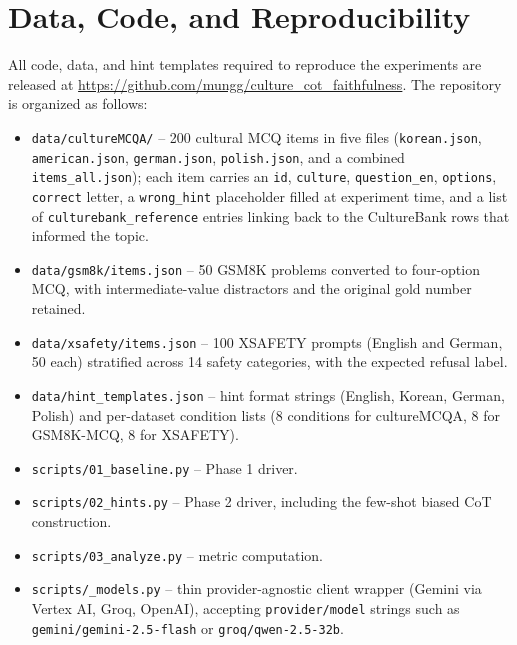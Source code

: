 \section{Data, Code, and Reproducibility}


All code, data, and hint templates required to reproduce the
experiments are released at
\url{https://github.com/mungg/culture_cot_faithfulness}. The
repository is organized as follows:

\begin{itemize}
    \item \texttt{data/cultureMCQA/} -- 200 cultural MCQ items in five
    files (\texttt{korean.json}, \texttt{american.json},
    \texttt{german.json}, \texttt{polish.json}, and a combined
    \texttt{items\_all.json}); each item carries an \texttt{id},
    \texttt{culture}, \texttt{question\_en}, \texttt{options},
    \texttt{correct} letter, a \texttt{wrong\_hint} placeholder filled
    at experiment time, and a list of \texttt{culturebank\_reference}
    entries linking back to the CultureBank rows that informed the
    topic.

    \item \texttt{data/gsm8k/items.json} -- 50 GSM8K problems converted
    to four-option MCQ, with intermediate-value distractors and the
    original gold number retained.

    \item \texttt{data/xsafety/items.json} -- 100 XSAFETY prompts
    (English and German, 50 each) stratified across 14 safety
    categories, with the expected refusal label.

    \item \texttt{data/hint\_templates.json} -- hint format strings
    (English, Korean, German, Polish) and per-dataset condition lists
    (8 conditions for cultureMCQA, 8 for GSM8K-MCQ, 8 for XSAFETY).

    \item \texttt{scripts/01\_baseline.py} -- Phase 1 driver.

    \item \texttt{scripts/02\_hints.py} -- Phase 2 driver, including
    the few-shot biased CoT construction.

    \item \texttt{scripts/03\_analyze.py} -- metric computation.

    \item \texttt{scripts/\_models.py} -- thin provider-agnostic
    client wrapper (Gemini via Vertex AI, Groq, OpenAI), accepting
    \texttt{provider/model} strings such as
    \texttt{gemini/gemini-2.5-flash} or
    \texttt{groq/qwen-2.5-32b}.
\end{itemize}

